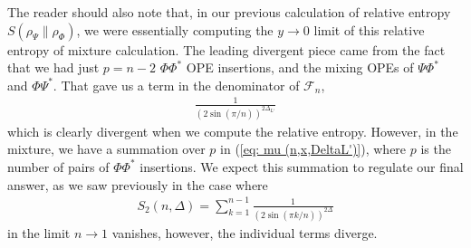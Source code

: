 \documentclass[11pt]{article}
\begin{document}
The reader should also note that, in our previous calculation of relative entropy $S(\rho_\Psi \| \rho_\Phi)$, we were essentially computing the $y \to 0$ limit of this relative entropy of mixture calculation. The leading divergent piece came from the fact that we had just $p=n-2$ $\Phi \Phi^*$ OPE insertions, and the mixing OPEs of $\Psi \Phi^*$ and $\Phi \Psi^*$. That gave us a term in the denominator of $\mathcal{F}_n$,
\begin{align}
    \frac{1}{(2\sin (\pi/n))^{2\Delta_{L'}}}
\end{align}
which is clearly divergent when we compute the relative entropy. However, in the mixture, we have a summation over $p$ in (\ref{eq: mu (n,x,DeltaL')}), where $p$ is the number of pairs of $\Phi \Phi^*$ insertions. We expect this summation to regulate our final answer, as we saw previously in the case where 
\begin{align}
    S_2(n,\Delta) = \sum_{k=1}^{n-1}\frac{1}{(2\sin(\pi k/n))^{2\Delta}}
\end{align}
in the limit $n\to 1$ vanishes, however, the individual terms diverge. 
\end{document}
